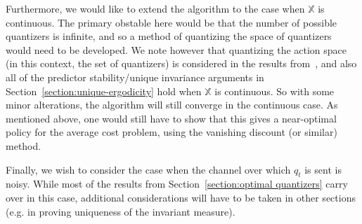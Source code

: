 \documentclass[conference]{IEEEtran}
\begin{document}
Furthermore, we would like to extend the algorithm to the case when \( \mathbb{X} \) is continuous. The primary obstable here would be that the number of possible quantizers is infinite, and so a method of quantizing the space of quantizers would need to be developed. We note however that quantizing the action space (in this context, the set of quantizers) is considered in the results from~\cite{Kara}, and also all of the predictor stability/unique invariance arguments in Section~\ref{section:unique-ergodicity} hold when \( \mathbb{X} \) is continuous. So with some minor alterations, the algorithm will still converge in the continuous case. As mentioned above, one would still have to show that this gives a near-optimal policy for the average cost problem, using the vanishing discount (or similar) method.

Finally, we wish to consider the case when the channel over which \(q_t\) is sent is noisy. While most of the results from Section~\ref{section:optimal quantizers} carry over in this case, additional considerations will have to be taken in other sections (e.g. in proving uniqueness of the invariant measure).

\printbibliography
\end{document}
